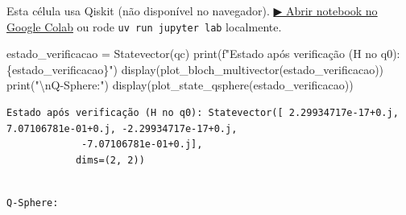 \documentclass[
  brazilian,
]{report}
\newenvironment{Shaded}{\begin{snugshade}}{\end{snugshade}}
\newcommand{\BuiltInTok}[1]{\textcolor[rgb]{0.00,0.23,0.31}{#1}}
\newcommand{\CharTok}[1]{\textcolor[rgb]{0.13,0.47,0.30}{#1}}
\newcommand{\NormalTok}[1]{\textcolor[rgb]{0.00,0.23,0.31}{#1}}
\newcommand{\OperatorTok}[1]{\textcolor[rgb]{0.37,0.37,0.37}{#1}}
\newcommand{\SpecialCharTok}[1]{\textcolor[rgb]{0.37,0.37,0.37}{#1}}
\newcommand{\SpecialStringTok}[1]{\textcolor[rgb]{0.13,0.47,0.30}{#1}}
\newcommand{\StringTok}[1]{\textcolor[rgb]{0.13,0.47,0.30}{#1}}
\begin{document}
\begin{tcolorbox}[enhanced jigsaw, arc=.35mm, bottomrule=.15mm, bottomtitle=1mm, breakable, colback=white, colbacktitle=quarto-callout-warning-color!10!white, colframe=quarto-callout-warning-color-frame, coltitle=black, left=2mm, leftrule=.75mm, opacityback=0, opacitybacktitle=0.6, rightrule=.15mm, title=\textcolor{quarto-callout-warning-color}{\faExclamationTriangle}\hspace{0.5em}{⚛️ Célula Qiskit --- execute no Colab ou localmente}, titlerule=0mm, toprule=.15mm, toptitle=1mm]

Esta célula usa Qiskit (não disponível no navegador).
\href{https://colab.research.google.com/github/maxwellamaral/aula-quantum/blob/main/notebooks/05-interference.ipynb}{▶
Abrir notebook no Google Colab} ou rode \texttt{uv\ run\ jupyter\ lab}
localmente.

\begin{Shaded}
\begin{Highlighting}[]

\NormalTok{estado\_verificacao }\OperatorTok{=}\NormalTok{ Statevector(qc)}
\BuiltInTok{print}\NormalTok{(}\SpecialStringTok{f"Estado após verificação (H no q0): }\SpecialCharTok{\{}\NormalTok{estado\_verificacao}\SpecialCharTok{\}}\SpecialStringTok{"}\NormalTok{)}
\NormalTok{display(plot\_bloch\_multivector(estado\_verificacao))}
\BuiltInTok{print}\NormalTok{(}\StringTok{"}\CharTok{\textbackslash{}n}\StringTok{Q{-}Sphere:"}\NormalTok{)}
\NormalTok{display(plot\_state\_qsphere(estado\_verificacao))}
\end{Highlighting}
\end{Shaded}

\end{tcolorbox}

\begin{verbatim}
Estado após verificação (H no q0): Statevector([ 2.29934717e-17+0.j,  7.07106781e-01+0.j, -2.29934717e-17+0.j,
             -7.07106781e-01+0.j],
            dims=(2, 2))
\end{verbatim}

\begin{verbatim}

Q-Sphere:
\end{verbatim}
\end{document}
